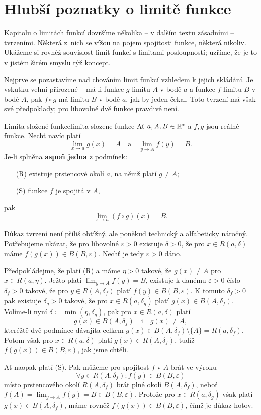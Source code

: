 \section{Hlubší poznatky o limitě funkce}
\label{sec:hlubsi-poznatky-o-limite-funkce}

Kapitolu o limitách funkcí dovršíme několika -- v dalším textu zásadními --
tvrzeními. Některá z~nich se vížou na pojem
\hyperref[def:spojita-funkce]{spojitosti funkce}, některá nikoliv. Ukážeme si
rovněž souvislost limit funkcí s limitami posloupností; uzříme, že je to v
jistém širém smyslu týž koncept.

Nejprve se pozastavíme nad chováním limit funkcí vzhledem k jejich skládání. Je
vskutku velmi přirozené -- má-li funkce $g$ limitu $A$ v bodě $a$ a funkce $f$
limitu $B$ v bodě $A$, pak $f \circ g$ má limitu $B$ v bodě $a$, jak by jeden
čekal. Toto tvrzení má však své předpoklady; pro libovolné dvě funkce pravdivé
není.

\begin{theorem}{Limita složené funkce}{limita-slozene-funkce}
 Ať $a,A,B \in \mathbb{R}^{*}$ a $f,g$ jsou reálné funkce. Nechť navíc platí
 \[
  \lim_{x \to a} g(x) = A \quad \text{a} \quad \lim_{y \to A} f(y) = B.
 \]
 Je-li splněna \textbf{aspoň jedna} z podmínek:
 \begin{itemize}
  \item [(R)] existuje prstencové okolí $a$, na němž platí $g \neq A$;
  \item [(S)] funkce $f$ je spojitá v $A$,
 \end{itemize}
 pak
 \[
  \lim_{x \to a} (f \circ g)(x) = B.
 \]
\end{theorem}
\begin{thmproof}
 Důkaz tvrzení není příliš obtížný, ale poněkud technický a alfabeticky náročný.
 Potřebujeme ukázat, že pro libovolné $\varepsilon>0$ existuje $\delta>0$, že
 pro $x \in R(a,\delta)$ máme $f(g(x)) \in B(B,\varepsilon)$. Nechť je tedy
 $\varepsilon>0$ dáno.

 Předpokládejme, že platí (R) a máme $\eta>0$ takové, že $g(x) \neq A$ pro $x
 \in R(a,\eta)$. Ježto platí $\lim_{y \to A} f(y) = B$, existuje k danému
 $\varepsilon>0$ číslo $\delta_f>0$ takové, že pro $y \in R(A,\delta_f)$ platí
 $f(y) \in B(B,\varepsilon)$. K tomuto $\delta_f>0$ pak existuje $\delta_g>0$
 takové, že pro $x \in R(a,\delta_g)$ platí $g(x) \in B(A,\delta_f)$. Volíme-li
 nyní $\delta \coloneqq \min(\eta,\delta_g)$, pak pro $x \in R(a,\delta)$ platí
 \[
  g(x) \in B(A,\delta_f) \quad \text{i} \quad g(x) \neq A,
 \]
 kteréžtě dvě podmínce dávajíta celkem $g(x) \in B(A,\delta_f) \setminus \{A\} =
 R(a,\delta_f)$. Potom však pro $x \in R(a,\delta)$ platí $g(x) \in
 R(A,\delta_f)$, tudíž $f(g(x)) \in B(B,\varepsilon)$, jak jsme chtěli.
  
 Ať naopak platí (S). Pak můžeme pro spojitost $f$ v $A$ brát ve výroku
 \[
 \forall y \in R(A,\delta_f): f(y) \in B(B,\varepsilon)
 \]
 místo prstencového okolí $R(A,\delta_f)$ brát plné okolí $B(A,\delta_f)$, neboť
 $f(A) = \lim_{y \to A} f(y) = B \in B(B,\varepsilon)$. Protože pro $x \in
 R(a,\delta_g)$ však platí $g(x) \in B(A,\delta_f)$, máme rovněž $f(g(x)) \in
 B(B,\varepsilon)$, čímž je důkaz hotov.  
\end{thmproof}

